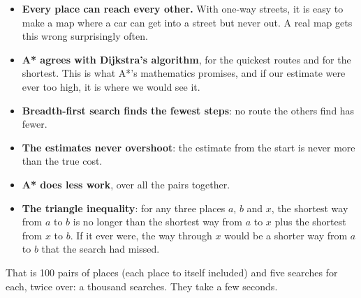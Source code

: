 \begin{itemize}[nosep]
  \item \textbf{Every place can reach every other.} With one-way streets,
    it is easy to make a map where a car can get into a street but never
    out. A real map gets this wrong surprisingly often.
  \item \textbf{A* agrees with Dijkstra's algorithm}, for the quickest
    routes and for the shortest. This is what A*'s mathematics promises,
    and if our estimate were ever too high, it is where we would see it.
  \item \textbf{Breadth-first search finds the fewest steps}: no route the
    others find has fewer.
  \item \textbf{The estimates never overshoot}: the estimate from the
    start is never more than the true cost.
  \item \textbf{A* does less work}, over all the pairs together.
  \item \textbf{The triangle inequality}: for any three places $a$, $b$
    and $x$, the shortest way from $a$ to $b$ is no longer than the
    shortest way from $a$ to $x$ plus the shortest from $x$ to $b$. If it
    ever were, the way through $x$ would be a shorter way from $a$ to $b$
    that the search had missed.
\end{itemize}

That is 100 pairs of places (each place to itself included) and five
searches for each, twice over: a thousand searches. They take a few
seconds.

